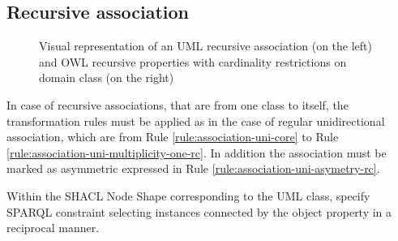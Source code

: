 \subsection{Recursive association}
\label{sec:association-self}

\begin{figure}[!ht]
	\centering
	\begin{subfigure}{.4\textwidth}
		\centering
	\end{subfigure}%
	\begin{subfigure}{.6\textwidth}
		\centering
	\end{subfigure}
	\caption{Visual representation of an UML recursive association (on the left) and OWL recursive properties with cardinality restrictions on domain class (on the right)}
	\label{fig:association-self-visual}
\end{figure}

In case of recursive associations, that are from one class to itself, the transformation rules must be applied as in the case of regular unidirectional association, which are from Rule \ref{rule:association-uni-core} to Rule \ref{rule:association-uni-multiplicity-one-rc}. In addition the association must be marked as asymmetric expressed in Rule \ref{rule:association-uni-asymetry-rc}. 

\begin{trule}
	\label{rule:association-uni-asymetry-ds}
	Within the SHACL Node Shape corresponding to the UML class, specify SPARQL constraint selecting instances connected by the object property in a reciprocal manner.
\end{trule}

